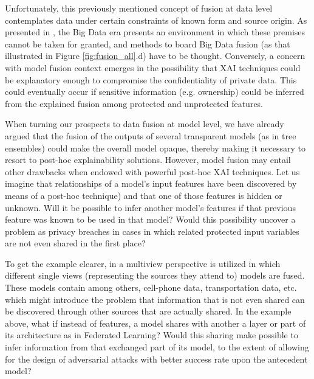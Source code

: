 \documentclass[final]{elsarticle}
\begin{document}
Unfortunately, this previously mentioned concept of fusion at data level contemplates data under certain constraints of known form and source origin. As presented in \cite{dong2013big}, the Big Data era presents an environment in which these premises cannot be taken for granted, and methods to board Big Data fusion (as that illustrated in Figure \ref{fig:fusion_all}.d) have to be thought. Conversely, a concern with model fusion context emerges in the possibility that XAI techniques could be explanatory enough to compromise the confidentiality of private data. This could eventually occur if sensitive information (e.g. ownership) could be inferred from the explained fusion among protected and unprotected features.

When turning our prospects to data fusion at model level, we have already argued that the fusion of the outputs of several transparent models (as in tree ensembles) could make the overall model opaque, thereby making it necessary to resort to post-hoc explainability solutions. However, model fusion may entail other drawbacks when endowed with powerful post-hoc XAI techniques. Let us imagine that relationships of a model's input features have been discovered by means of a post-hoc technique) and that one of those features is hidden or unknown. Will it be possible to infer another model's features if that previous feature was known to be used in that model? Would this possibility uncover a problem as privacy breaches in cases in which related protected input variables are not even shared in the first place?

To get the example clearer, in \cite{zhang2015comobile} a multiview perspective is utilized in which different single views (representing the sources they attend to) models are fused. These models contain among others, cell-phone data, transportation data, etc. which might introduce the problem that information that is not even shared can be discovered through other sources that are actually shared. In the example above, what if instead of features, a model shares with another a layer or part of its architecture as in Federated Learning? Would this sharing make possible to infer information from that exchanged part of its model, to the extent of allowing for the design of adversarial attacks with better success rate upon the antecedent model? 
\end{document}
